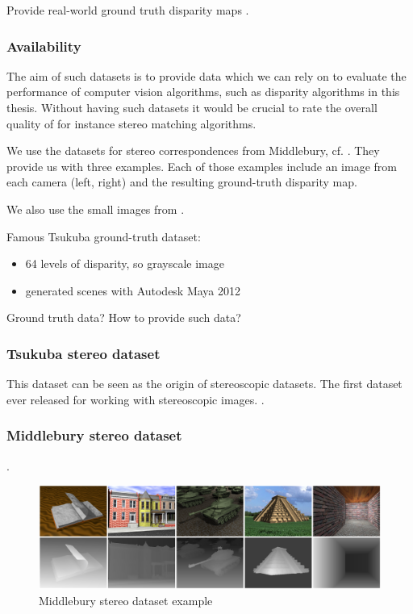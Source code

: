 Provide real-world ground truth disparity maps \citep{kondermann2015stereo}.

\subsubsection*{Availability}

The aim of such datasets is to provide data which we can rely on to evaluate the performance of computer vision algorithms, such as disparity algorithms in this thesis.
 Without having such datasets it would be crucial to rate the overall quality of for instance stereo matching algorithms.

We use the datasets for stereo correspondences from Middlebury, cf.  \citep{scharstein2014high}. They provide us with three examples. Each of those examples include an image from each camera (left, right) and the resulting ground-truth disparity map.

We also use the small images from \citep{martull2012realistic}.

Famous Tsukuba ground-truth dataset:

\begin{itemize}
  \item 64 levels of disparity, so grayscale image
  \item generated scenes with Autodesk Maya 2012
\end{itemize}

\citep{martull2012realistic}

Ground truth data? How to provide such data?


\subsubsection{Tsukuba stereo dataset}

This dataset can be seen as the origin of stereoscopic datasets.
The first dataset ever released for working with stereoscopic images.
\citep{martull2012realistic}.


\subsubsection{Middlebury stereo dataset}

\citep{scharstein2014high}.

\begin{figure}[h!]
  \centering
  \includegraphics[width=1.0\textwidth]{src/images/dbcgrid-dataset.png}
  \caption[Middlebury stereo dataset example]{Middlebury stereo dataset example}
  \label{fig:dbcgrid-dataset}
\end{figure}

